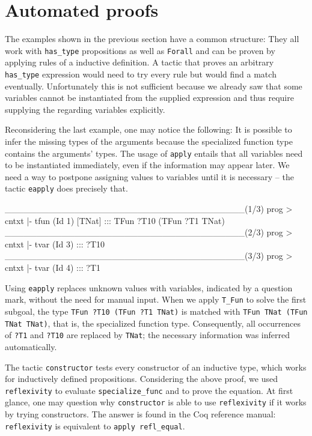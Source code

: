 \documentclass[paper = a4, fleqn, abstract=on, twoside]{scrreprt}
\newcommand{\coqinline}[1]{\texttt{#1}}
\begin{document}
\section{Automated proofs}
\label{autoproof}
The examples shown in the previous section have a common structure: They all work with \coqinline{has_type} propositions as well as \texttt{Forall} and can be proven by applying rules of a inductive definition. A tactic that proves an arbitrary \coqinline{has_type} expression would need to try every rule but would find a match eventually. Unfortunately this is not sufficient because we already saw that some variables cannot be instantiated from the supplied expression and thus require supplying the regarding variables explicitly.
\par
Reconsidering the last example, one may notice the following: It is possible to infer the missing types of the arguments because the specialized function type contains the arguments' types. The usage of \coqinline{apply} entails that all variables need to be instantiated immediately, even if the information may appear later. We need a way to postpone assigning values to variables until it is necessary -- the tactic \coqinline{eapply} does precisely that. 
\begin{coqcode}
______________________________________(1/3)
prog > cntxt |- tfun (Id 1) [TNat] ::: TFun ?T10 (TFun ?T1 TNat)
______________________________________(2/3)
prog > cntxt |- tvar (Id 3) ::: ?T10
______________________________________(3/3)
prog > cntxt |- tvar (Id 4) ::: ?T1
\end{coqcode}
Using \coqinline{eapply} replaces unknown values with variables, indicated by a question mark, without the need for manual input. When we apply \coqinline{T_Fun} to solve the first subgoal, the type \coqinline{TFun ?T10 (TFun ?T1 TNat)} is matched with \coqinline{TFun TNat (TFun TNat TNat)}, that is, the specialized function type. Consequently, all occurrences of \texttt{?T1} and \texttt{?T10} are replaced by \texttt{TNat}; the necessary information was inferred automatically.\\
\par \noindent
The tactic \coqinline{constructor} tests every constructor of an inductive type, which works for inductively defined propositions. Considering the above proof, we used \texttt{reflexivity} to evaluate \texttt{specialize\_func} and to prove the equation. At first glance, one may question why \texttt{constructor} is able to use \texttt{reflexivity} if it works by trying constructors. The answer is found in the Coq reference manual\citet{CoqManualV8}: \texttt{reflexivity} is equivalent to \texttt{apply refl\_equal}.
\end{document}
